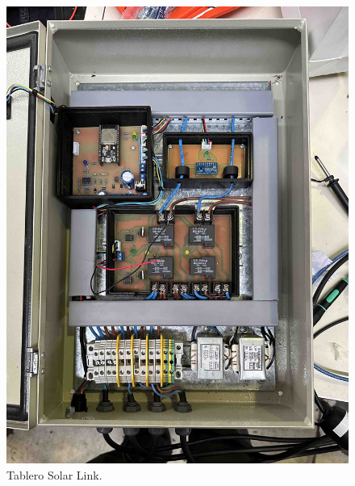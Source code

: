 \begin{figure}[H]
    \centering
    \includegraphics[width=1\linewidth]{hardware/IMG_9354.jpg}
    \caption{Tablero Solar Link.}
    \label{fig:enter-label}
\end{figure}

